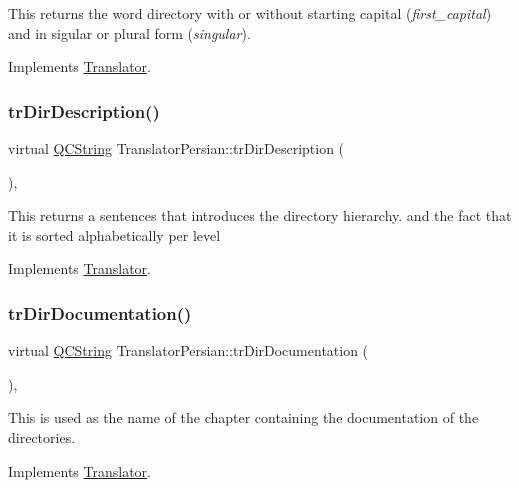 This returns the word directory with or without starting capital ({\itshape first\+\_\+capital}) and in sigular or plural form ({\itshape singular}). 

Implements \mbox{\hyperlink{class_translator}{Translator}}.

\mbox{\label{class_translator_persian_a1e906fbdd8542727e85517dde013d53b}} 
\subsubsection{\texorpdfstring{trDirDescription()}{trDirDescription()}}
{\footnotesize\ttfamily virtual \mbox{\hyperlink{class_q_c_string}{Q\+C\+String}} Translator\+Persian\+::tr\+Dir\+Description (\begin{DoxyParamCaption}{ }\end{DoxyParamCaption})\hspace{0.3cm}{\ttfamily [inline]}, {\ttfamily [virtual]}}

This returns a sentences that introduces the directory hierarchy. and the fact that it is sorted alphabetically per level 

Implements \mbox{\hyperlink{class_translator}{Translator}}.

\mbox{\label{class_translator_persian_a3100df4d9e74a6ae67a17f70268caaf2}} 
\subsubsection{\texorpdfstring{trDirDocumentation()}{trDirDocumentation()}}
{\footnotesize\ttfamily virtual \mbox{\hyperlink{class_q_c_string}{Q\+C\+String}} Translator\+Persian\+::tr\+Dir\+Documentation (\begin{DoxyParamCaption}{ }\end{DoxyParamCaption})\hspace{0.3cm}{\ttfamily [inline]}, {\ttfamily [virtual]}}

This is used as the name of the chapter containing the documentation of the directories. 

Implements \mbox{\hyperlink{class_translator}{Translator}}.

